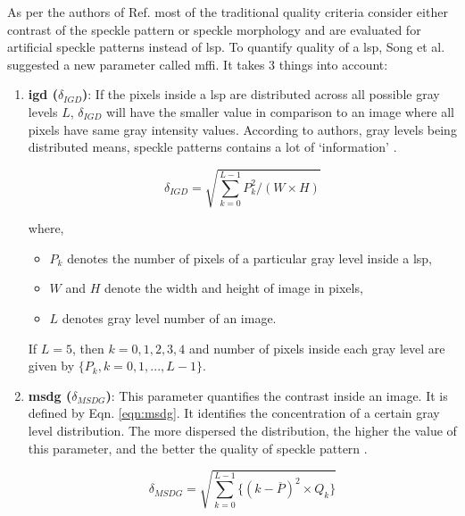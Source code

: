         As per the authors of Ref. \cite{song} most of the traditional quality criteria consider either contrast of the speckle pattern or speckle morphology and are evaluated for artificial speckle patterns instead of \gls{lsp}. To quantify quality of a \gls{lsp}, Song et al. suggested a new parameter called \gls{mffi}. It takes 3 things into account:
        \begin{enumerate}
            
            \item \textbf{\gls{igd} ($\delta_{IGD}$)}: If the pixels inside a \gls{lsp} are distributed across all possible gray levels $L$, $\delta_{IGD}$ will have the smaller value in comparison to an image where all pixels have same gray intensity values. According to authors, gray levels being distributed means, speckle patterns contains a lot of `information' \cite{song}.
                
                \begin{equation}
                    \delta_{IGD} = \sqrt{\sum_{k=0}^{L-1} P_{k}^{2} / (W \times H)}
                \end{equation}
                
                \noindent where, 
                \begin{itemize}
                    \item $P_k$ denotes the number of pixels of a particular gray level inside a \gls{lsp},
                    \item $W$ and $H$ denote the width and height of image in pixels,
                    \item $L$ denotes gray level number of an image.
                \end{itemize}

                \noindent If $L = 5$, then $k = {0, 1, 2, 3, 4}$ and number of pixels inside each gray level are given by \(\{P_k, k = 0, 1, ... , L-1\}\).

            \item \textbf{\gls{msdg} ($\delta_{MSDG}$)}: This parameter quantifies the contrast inside an image. It is defined by Eqn. \ref{eqn:msdg}. It identifies the concentration of a certain gray level distribution. The more dispersed the distribution, the higher the value of this parameter, and the better the quality of speckle pattern \cite{song}. 
                
                \begin{equation}
                    \delta_{MSDG} = \sqrt{\sum_{k=0}^{L-1} \biggl\{ (k - \overline{P})^2 \times Q_k \biggr\}}
                    \label{eqn:msdg}
                \end{equation}


\end{enumerate}
